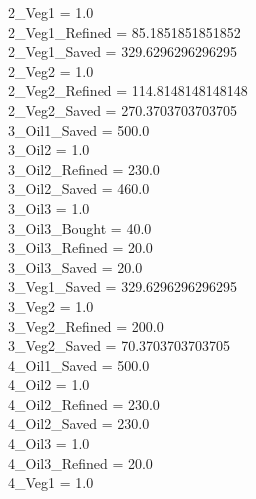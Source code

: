 2\_Veg1 = 1.0\\
2\_Veg1\_Refined = 85.1851851851852\\
2\_Veg1\_Saved = 329.6296296296295\\
2\_Veg2 = 1.0\\
2\_Veg2\_Refined = 114.8148148148148\\
2\_Veg2\_Saved = 270.3703703703705\\
3\_Oil1\_Saved = 500.0\\
3\_Oil2 = 1.0\\
3\_Oil2\_Refined = 230.0\\
3\_Oil2\_Saved = 460.0\\
3\_Oil3 = 1.0\\
3\_Oil3\_Bought = 40.0\\
3\_Oil3\_Refined = 20.0\\
3\_Oil3\_Saved = 20.0\\
3\_Veg1\_Saved = 329.6296296296295\\
3\_Veg2 = 1.0\\
3\_Veg2\_Refined = 200.0\\
3\_Veg2\_Saved = 70.3703703703705\\
4\_Oil1\_Saved = 500.0\\
4\_Oil2 = 1.0\\
4\_Oil2\_Refined = 230.0\\
4\_Oil2\_Saved = 230.0\\
4\_Oil3 = 1.0\\
4\_Oil3\_Refined = 20.0\\
4\_Veg1 = 1.0\\
